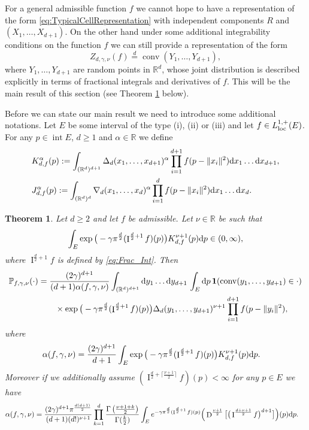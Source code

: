\documentclass[11pt,a4paper]{article}
\theoremstyle{plain}
\newtheorem{theorem}{Theorem}[section]
\theoremstyle{definition}
\theoremstyle{remark}
\def\PP{\mathbb{P}}
\def\RR{\mathbb{R}}
\newcommand{\dd}{{\rm d}}
\newcommand{\conv}{\mathop{\mathrm{conv}}\nolimits}
\newcommand{\frI}{\mathop{\mathrm{I}}\nolimits}
\newcommand{\frD}{\mathop{\mathrm{D}}\nolimits}
\newcommand{\inter}{\operatorname{int}}
\begin{document}
For a general admissible function $f$ we cannot hope to have a representation of the form \eqref{eq:TypicalCellRepresentation} with independent components $R$ and $(X_1,\ldots,X_{d+1})$. On the other hand under some additional integrability conditions on the function $f$ we can still provide a representation of the form 
\[
    Z_{d,\gamma,\nu}(f)\overset{d}{=}\conv(Y_1,\ldots,Y_{d+1}),
\]
where $Y_1,\ldots,Y_{d+1}$ are random points in $\RR^d$, whose joint distribution is described explicitly in terms of fractional integrals and derivatives of $f$. This will be the main result of this section (see Theorem \ref{thm:typcell} below).

Before we can state our main result we need to introduce some additional notations. Let $E$ be some interval of the type (i), (ii) or (iii) and let $f\in L_{\rm loc}^{1,+}(E)$. For any $p\in \inter E$, $d\ge 1$ and $\alpha\in \RR$ we define
\begin{align*}
    &K_{d,f}^\alpha(p):=\int_{(\RR^d)^{d+1}} \Delta_d(x_1,\dots,x_{d+1})^\alpha \prod_{i=1}^{d+1} f(p-\|x_i\|^2)\dd x_1\dots \dd x_{d+1},\\
    &J_{d,f}^\alpha(p):=\int_{(\RR^d)^{d}} \nabla_d(x_1,\dots,x_d)^\alpha \prod_{i=1}^{d}f(p-\|x_i\|^2)\dd x_1\dots \dd x_d.
\end{align*}

\begin{theorem}\label{thm:typcell}
    Let $d\ge 2$ and let $f$ be admissible. Let $\nu\in \RR$ be such that
    \begin{equation}\label{eq:FiniteNormalizationConst}
        \int_{E}\exp\big(-\gamma\pi^{\frac{d}{2}}(\frI^{\frac{d}{2}+1}f)(p)\big) K^{\nu+1}_{d,f}(p)\dd p\in (0,\infty),
    \end{equation}
    where $\frI^{\frac{d}{2}+1}f$ is defined by \eqref{eq:Frac_Int}. Then
    \begin{align*}
        \PP_{f,\gamma,\nu}(\cdot)&=\frac{{(2\gamma)^{d+1}}}{(d+1)\alpha(f,\gamma,\nu)} \int_{(\RR^{d})^{d+1}}\dd y_1\dots \dd y_{d+1} \, \int_{E}\dd p\,{\bf 1}(\conv(y_1,\dots,y_{d+1})\in \cdot) \\
        &\qquad\times \exp\big(-\gamma\pi^\frac{d}{2} (\frI^{\frac{d}{2}+1}f)(p)\big) \Delta_{d}(y_1,\dots,y_{d+1})^{\nu+1}\prod_{i=1}^{d+1}f(p-\|y_i\|^2),
    \end{align*}
    where
   \begin{align}
        \alpha(f,\gamma,\nu)&=\frac{{(2\gamma)^{d+1}}}{d+1}\int_{E}\exp\big(-\gamma\pi^{\frac{d}{2}}(\frI^{\frac{d}{2}+1}f)(p)\big) K^{\nu+1}_{d,f}(p)\dd p.
        \label{eq:BoundNormalizationConst}
    \end{align}
    Moreover if we additionally assume $(\frI^{\frac{d}{2}+\lceil\frac{\nu+1}{2}\rceil}f)(p)<\infty$ for any $p\in E$ we have
    \begin{align*}
        \alpha(f,\gamma,\nu)&=\frac{{(2\gamma)^{d+1}}\pi^{{d(d+1)\over 2}}}{(d+1)(d!)^{\nu+1}} \prod_{k=1}^{d}\frac{\Gamma\left(\frac{\nu+1+k}{2}\right)}{\Gamma(\frac{k}{2})}\int_{E}e^{-\gamma\pi^{\frac{d}{2}}(\frI^{\frac{d}{2}+1}f)(p)} \Big(\frD^{\frac{\nu+1}{2}}\big[\big(\frI^{\frac{d+\nu+1}{2}}f\big)^{d+1}\big]\Big)(p) \dd p.
    \end{align*}
\end{theorem}
\end{document}
